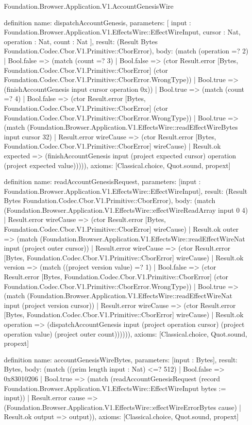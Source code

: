 \begin{lexlean}{Foundation.Browser.Application.V1.AccountGenesisWire}
\begin{semanticmodule}
definition{
  name: dispatchAccountGenesis,
  parameters: [
    input : Foundation.Browser.Application.V1.EffectsWire::EffectWireInput,
    cursor : Nat,
    operation : Nat,
    count : Nat
  ],
  result: (Result Bytes Foundation.Codec.Cbor.V1.Primitive::CborError),
  body: (match (operation =? 2)
    | Bool.false => (match (count =? 3)
      | Bool.false => (ctor Result.error [Bytes, Foundation.Codec.Cbor.V1.Primitive::CborError] (ctor Foundation.Codec.Cbor.V1.Primitive::CborError.WrongType))
      | Bool.true => (finishAccountGenesis input cursor operation 0x))
    | Bool.true => (match (count =? 4)
      | Bool.false => (ctor Result.error [Bytes, Foundation.Codec.Cbor.V1.Primitive::CborError] (ctor Foundation.Codec.Cbor.V1.Primitive::CborError.WrongType))
      | Bool.true => (match (Foundation.Browser.Application.V1.EffectsWire::readEffectWireBytes input cursor 32)
        | Result.error wireCause => (ctor Result.error [Bytes, Foundation.Codec.Cbor.V1.Primitive::CborError] wireCause)
        | Result.ok expected => (finishAccountGenesis input (project expected cursor) operation (project expected value))))),
  axioms: [Classical.choice, Quot.sound, propext]
}

definition{
  name: readAccountGenesisRequest,
  parameters: [input : Foundation.Browser.Application.V1.EffectsWire::EffectWireInput],
  result: (Result Bytes Foundation.Codec.Cbor.V1.Primitive::CborError),
  body: (match (Foundation.Browser.Application.V1.EffectsWire::effectWireReadArray input 0 4)
    | Result.error wireCause => (ctor Result.error [Bytes, Foundation.Codec.Cbor.V1.Primitive::CborError] wireCause)
    | Result.ok outer => (match (Foundation.Browser.Application.V1.EffectsWire::readEffectWireNat input (project outer cursor))
      | Result.error wireCause => (ctor Result.error [Bytes, Foundation.Codec.Cbor.V1.Primitive::CborError] wireCause)
      | Result.ok version => (match ((project version value) =? 1)
        | Bool.false => (ctor Result.error [Bytes, Foundation.Codec.Cbor.V1.Primitive::CborError] (ctor Foundation.Codec.Cbor.V1.Primitive::CborError.WrongType))
        | Bool.true => (match (Foundation.Browser.Application.V1.EffectsWire::readEffectWireNat input (project version cursor))
          | Result.error wireCause => (ctor Result.error [Bytes, Foundation.Codec.Cbor.V1.Primitive::CborError] wireCause)
          | Result.ok operation => (dispatchAccountGenesis input (project operation cursor) (project operation value) (project outer count)))))),
  axioms: [Classical.choice, Quot.sound, propext]
}

definition{
  name: accountGenesisWireBytes,
  parameters: [input : Bytes],
  result: Bytes,
  body: (match ((prim length input : Nat) <=? 512)
    | Bool.false => 0x83010206
    | Bool.true => (match (readAccountGenesisRequest (record Foundation.Browser.Application.V1.EffectsWire::EffectWireInput {bytes := input}))
      | Result.error cause => (Foundation.Browser.Application.V1.EffectsWire::effectWireErrorBytes cause)
      | Result.ok output => output)),
  axioms: [Classical.choice, Quot.sound, propext]
}
\end{semanticmodule}
\end{lexlean}
